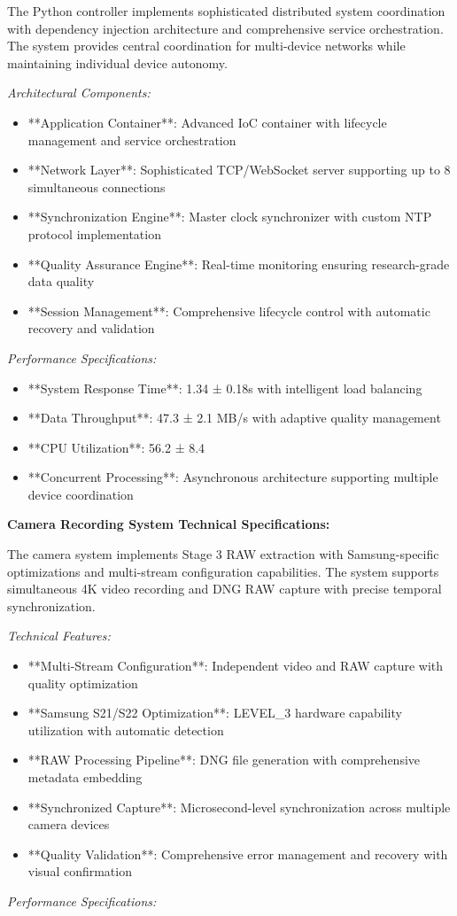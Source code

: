 \documentclass[12pt,a4paper]{article}
\begin{document}
The Python controller implements sophisticated distributed system coordination with dependency injection architecture
and comprehensive service orchestration. The system provides central coordination for multi-device networks while
maintaining individual device autonomy.

\textit{Architectural Components:}

\begin{itemize}
\item **Application Container**: Advanced IoC container with lifecycle management and service orchestration
\item **Network Layer**: Sophisticated TCP/WebSocket server supporting up to 8 simultaneous connections
\item **Synchronization Engine**: Master clock synchronizer with custom NTP protocol implementation
\item **Quality Assurance Engine**: Real-time monitoring ensuring research-grade data quality
\item **Session Management**: Comprehensive lifecycle control with automatic recovery and validation

\end{itemize}
\textit{Performance Specifications:}

\begin{itemize}
\item **System Response Time**: 1.34 ± 0.18s with intelligent load balancing
\item **Data Throughput**: 47.3 ± 2.1 MB/s with adaptive quality management
\item **CPU Utilization**: 56.2 ± 8.4%
\item **Concurrent Processing**: Asynchronous architecture supporting multiple device coordination

\end{itemize}
\textbf{Camera Recording System Technical Specifications:}

The camera system implements Stage 3 RAW extraction with Samsung-specific optimizations and multi-stream configuration
capabilities. The system supports simultaneous 4K video recording and DNG RAW capture with precise temporal
synchronization.

\textit{Technical Features:}

\begin{itemize}
\item **Multi-Stream Configuration**: Independent video and RAW capture with quality optimization
\item **Samsung S21/S22 Optimization**: LEVEL_3 hardware capability utilization with automatic detection
\item **RAW Processing Pipeline**: DNG file generation with comprehensive metadata embedding
\item **Synchronized Capture**: Microsecond-level synchronization across multiple camera devices
\item **Quality Validation**: Comprehensive error management and recovery with visual confirmation

\end{itemize}
\textit{Performance Specifications:}
\end{document}
